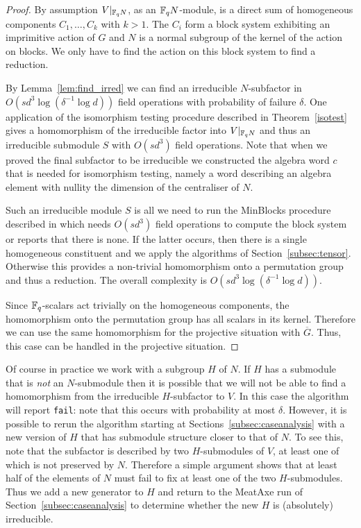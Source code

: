 \begin{proof}
By assumption  $V|_{\mathbb{F}_q N}$, as an $\mathbb{F}_q N$-module, is a
direct sum of  homogeneous components $C_1, \ldots, C_k$ with $k > 1$.
The $C_i$ form a block system exhibiting an imprimitive action
of $G$ and $N$ is a normal subgroup of the kernel of the action on
blocks. We only have to find the action on this block system to find a
reduction.

By Lemma~\ref{lem:find_irred} we can find an irreducible $N$-subfactor
in $O(sd^3 \log (\delta^{-1} \log d))$ field operations with probability
of failure $\delta$. One application of the isomorphism testing
procedure described in Theorem~\ref{isotest} gives a homomorphism of the
irreducible factor into $V|_{\mathbb{F}_q N}$ and thus an irreducible submodule
$S$ with $O(sd^3)$ field operations. Note that when we
proved the final subfactor to be irreducible  we constructed the algebra
word $c$ that is needed for isomorphism testing, namely a word 
describing an algebra element with nullity the dimension of
the centraliser of $N$.

Such an irreducible module $S$ is all we need to run the {\sc
MinBlocks} procedure described in \cite{smashprim} which needs
$O(sd^3)$ field operations to compute the block system or reports
that there is none. If the latter occurs, then there is a single 
homogeneous constituent and we apply the algorithms of 
Section~\ref{subsec:tensor}. Otherwise
this provides a non-trivial homomorphism onto a permutation
group and thus a reduction. The overall complexity 
is $O(sd^3\log(\delta^{-1} \log d))$.

Since $\mathbb{F}_q$-scalars act trivially on the homogeneous
components, the homomorphism onto the permutation group has all
scalars in its kernel. Therefore we can use the same homomorphism
for the projective situation with $\overline{G}$. Thus,  this case
can be handled in the projective situation.
\end{proof}

Of course in practice we work with a subgroup $H$ of $N$. If $H$
has a submodule that is \emph{not} an $N$-submodule then it is
possible that we will not be able to find a homomorphism from the
irreducible $H$-subfactor to $V$. In this case the algorithm will report
{\tt fail}: note that this occurs with probability at most $\delta$. 
However, it is possible to rerun the algorithm starting at
Sections~\ref{subsec:caseanalysis} with a new version of $H$ that has
submodule structure closer to that of $N$. To see this, note that
the subfactor is described by two $H$-submodules of $V$, at least one
of which is not preserved by $N$. Therefore a simple argument shows that at
least half of the elements of $N$ must fail to fix at least one of the
two $H$-submodules. Thus we add a new generator to $H$ and return to the
MeatAxe run of Section~\ref{subsec:caseanalysis} to determine whether
the new $H$ is (absolutely) irreducible.



